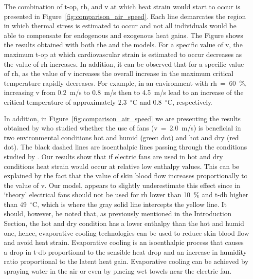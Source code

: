 The combination of \ac{t-op}, \ac{rh}, and \ac{v} at which heat strain would start to occur is presented in Figure~\ref{fig:comparison_air_speed}.
Each line demarcates the region in which thermal stress is estimated to occur and not all individuals would be able to compensate for endogenous and exogenous heat gains.
The Figure shows the results obtained with both the  and the  models.
For a specific value of \ac{v}, the maximum \ac{t-op} at which cardiovascular strain is estimated to occur decreases as the value of \ac{rh} increases.
In addition, it can be observed that for a specific value of \ac{rh}, as the value of \ac{v} increases the overall increase in the maximum critical temperature rapidly decreases.
For example, in an environment with \ac{rh}~=~60~\%, increasing \ac{v} from 0.2~m/s to 0.8~m/s then to 4.5~m/s lead to an increase of the critical temperature of approximately 2.3~$^{\circ}$C and 0.8~$^{\circ}$C, respectively.

In addition, in Figure~\ref{fig:comparison_air_speed} we are presenting the results obtained by  who studied whether the use of fans (\ac{v}~=~2.0~m/s) is beneficial in two environmental conditions hot and humid (green dot) and hot and dry (red dot).
The black dashed lines are isoenthalpic lines passing through the conditions studied by .
Our results show that if electric fans are used in hot and dry conditions heat strain would occur at relative low enthalpy values.
This can be explained by the fact that the value of skin blood flow increases proportionally to the value of \ac{v}.
Our model, appears to slightly underestimate this effect since in `theory' electrical fans should not be used for \ac{rh} lower than 10~\% and \ac{t-db} higher than 49~$^{\circ}$C\@, which is where the gray solid line intercepts the yellow line.
It should, however, be noted that, as previously mentioned in the Introduction Section, the hot and dry condition has a lower enthalpy than the hot and humid one, hence, evaporative cooling technologies can be used to reduce skin blood flow and avoid heat strain.
Evaporative cooling is an isoenthalpic process that causes a drop in \ac{t-db} proportional to the sensible heat drop and an increase in humidity ratio proportional to the latent heat gain.
Evaporative cooling can be achieved by spraying water in the air or even by placing wet towels near the electric fan.

